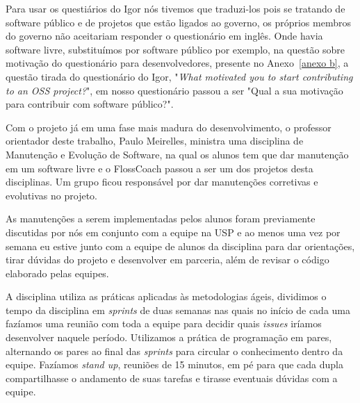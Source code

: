 Para usar os questiários do Igor nós tivemos que traduzi-los pois se tratando de
software público e de projetos que estão ligados ao governo, os próprios membros 
do governo não aceitariam responder o questionário em inglês. Onde havia software 
livre, substituímos por software público por exemplo, na questão sobre motivação
do questionário para desenvolvedores, presente no Anexo~\ref{anexo b}, a questão 
tirada do questionário do Igor, "\textit{What motivated you to start contributing 
to an OSS project?}", em nosso questionário passou a ser "Qual a sua motivação para 
contribuir com software público?".

Com o projeto já em uma fase mais madura do desenvolvimento, o professor orientador
deste trabalho, Paulo Meirelles, ministra uma disciplina de Manutenção e Evolução de
Software, na qual os alunos tem que dar manutenção em um software livre e o FlossCoach
passou a ser um dos projetos desta disciplinas. Um grupo ficou responsável por dar 
manutenções corretivas e evolutivas no projeto.

As manutenções a serem implementadas pelos alunos foram previamente discutidas
por nós em conjunto com a equipe na USP e ao menos uma vez por semana eu estive junto com a 
equipe de alunos da disciplina para dar orientações, tirar dúvidas do projeto
e desenvolver em parceria, além de revisar o código elaborado pelas equipes.
 
A disciplina utiliza as práticas aplicadas às metodologias ágeis, dividimos o tempo 
da disciplina em \textit{sprints} de duas semanas nas quais no início de cada uma 
fazíamos uma reunião com toda a equipe para decidir quais \textit{issues} iríamos 
desenvolver naquele período. Utilizamos a prática de programação em pares, alternando
os pares ao final das \textit{sprints} para circular o conhecimento dentro da equipe.
Fazíamos \textit{stand up}, reuniões de 15 minutos, em pé para que cada dupla compartilhasse
o andamento de suas tarefas e tirasse eventuais dúvidas com a equipe.
